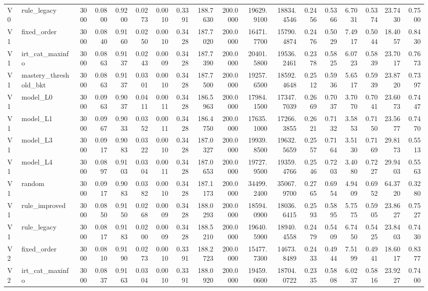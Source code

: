 \begin{table}
\begin{tabular}{llrrrrrrrrrrrrrrrr}
V0 & rule\_legacy & 3000 & 0.0800 & 0.9200 & 0.0273 & 0.0010 & 0.3391 & 188.7630 & 200.0000 & 19629.9100 & 18834.4546 & 0.2456 & 0.5366 & 6.7031 & 0.5374 & 23.7430 & 0.7500 \\
V1 & fixed\_order & 3000 & 0.0840 & 0.9160 & 0.0250 & 0.0010 & 0.3428 & 187.7020 & 200.0000 & 16471.7700 & 15790.4874 & 0.2476 & 0.5029 & 7.4917 & 0.5044 & 18.4057 & 0.8430 \\
V1 & irt\_cat\_maxinfo & 3000 & 0.0863 & 0.9137 & 0.0243 & 0.0009 & 0.3428 & 187.7390 & 200.0000 & 20401.5800 & 19536.2461 & 0.2378 & 0.5825 & 6.0723 & 0.5839 & 23.7017 & 0.7673 \\
V1 & mastery\_threshold\_bkt & 3000 & 0.0863 & 0.9137 & 0.0301 & 0.0010 & 0.3428 & 187.7500 & 200.0000 & 19257.6500 & 18592.4648 & 0.2512 & 0.5936 & 5.6517 & 0.5939 & 23.8720 & 0.7397 \\
V1 & model\_L0 & 3000 & 0.0963 & 0.9037 & 0.0411 & 0.0011 & 0.3428 & 186.5963 & 200.0000 & 17984.1500 & 17347.7039 & 0.2669 & 0.7037 & 3.7070 & 0.7041 & 23.6073 & 0.7447 \\
V1 & model\_L1 & 3000 & 0.0967 & 0.9033 & 0.0352 & 0.0011 & 0.3428 & 186.4750 & 200.0000 & 17635.1000 & 17266.3855 & 0.2621 & 0.7132 & 3.5853 & 0.7150 & 23.5677 & 0.7470 \\
V1 & model\_L3 & 3000 & 0.0917 & 0.9083 & 0.0322 & 0.0010 & 0.3428 & 187.0327 & 200.0000 & 19939.8500 & 19632.5659 & 0.2557 & 0.7164 & 3.5130 & 0.7169 & 29.8173 & 0.5513 \\
V1 & model\_L4 & 3000 & 0.0897 & 0.9103 & 0.0304 & 0.0011 & 0.3428 & 187.0653 & 200.0000 & 19727.9500 & 19359.4766 & 0.2546 & 0.7203 & 3.4080 & 0.7227 & 29.9403 & 0.5563 \\
V1 & random & 3000 & 0.0917 & 0.9083 & 0.0382 & 0.0010 & 0.3428 & 187.1173 & 200.0000 & 34499.2400 & 35067.9700 & 0.2765 & 0.6954 & 4.9409 & 0.6952 & 64.3720 & 0.3280 \\
V1 & rule\_improved & 3000 & 0.0850 & 0.9150 & 0.0268 & 0.0009 & 0.3428 & 188.0293 & 200.0000 & 18594.0900 & 18036.6415 & 0.2593 & 0.5895 & 5.7575 & 0.5905 & 23.8627 & 0.7527 \\
V1 & rule\_legacy & 3000 & 0.0817 & 0.9183 & 0.0200 & 0.0009 & 0.3428 & 188.5210 & 200.0000 & 19640.5900 & 18940.4558 & 0.2479 & 0.5409 & 6.7450 & 0.5425 & 23.8403 & 0.7430 \\
V2 & fixed\_order & 3000 & 0.0810 & 0.9190 & 0.0273 & 0.0010 & 0.3391 & 188.2723 & 200.0000 & 15477.7300 & 14673.8489 & 0.2433 & 0.4944 & 7.5199 & 0.4941 & 18.6017 & 0.8377 \\
V2 & irt\_cat\_maxinfo & 3000 & 0.0837 & 0.9163 & 0.0304 & 0.0010 & 0.3391 & 188.0920 & 200.0000 & 19459.0600 & 18704.0722 & 0.2335 & 0.5808 & 6.0237 & 0.5816 & 23.9227 & 0.7400 \\

\end{tabular}
\end{table}
